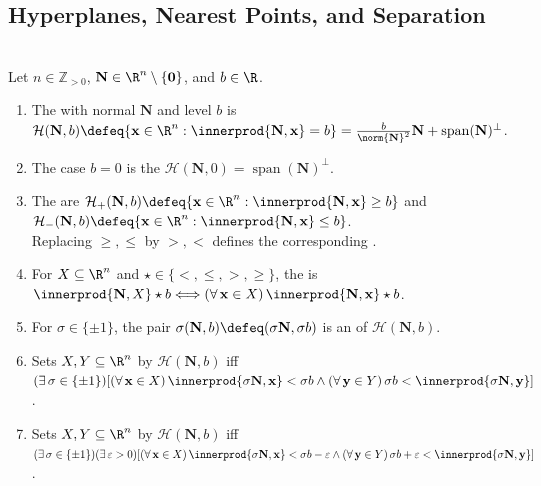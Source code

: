 \subsection{Hyperplanes, Nearest Points, and Separation}

\begin{definition} \label{def:affine-hyperplanes-halfspaces-separation} \\
Let $n\in\mathbb{Z}_{>0}$, $\mathbf{N}\in\R^n\setminus\{\mathbf{0}\}$, and $b\in\R$.
\begin{enumerate}[label=(\roman*)]
\setlength{\itemsep}{0pt}
\item The  with normal $\mathbf{N}$ and level $b$ is $\mathcal{H}(\mathbf{N},b)\defeq\{\mathbf{x}\in\R^n:\innerprod{\mathbf{N},\mathbf{x}}=b\}=\frac{b}{\norm{\mathbf{N}}^2}\mathbf{N}+\operatorname{span}(\mathbf{N})^\perp$.
\item The case $b=0$ is the  $\mathcal{H}(\mathbf{N},0)=\operatorname{span}(\mathbf{N})^\perp$.
\item The  are $\mathcal{H}_+(\mathbf{N},b)\defeq\{\mathbf{x}\in\R^n:\innerprod{\mathbf{N},\mathbf{x}}\geq b\}$ and $\mathcal{H}_-(\mathbf{N},b)\defeq\{\mathbf{x}\in\R^n:\innerprod{\mathbf{N},\mathbf{x}}\leq b\}$.\\
Replacing $\geq,\leq$ by $>,<$ defines the corresponding .
\item For $X\subseteq\R^n$ and $\star\in\{<,\leq,>,\geq\}$, the  is $\innerprod{\mathbf{N},X}\star b\Longleftrightarrow(\forall\,\mathbf{x}\in X)\,\innerprod{\mathbf{N},\mathbf{x}}\star b$.
\item For $\sigma\in\{\pm1\}$, the pair $\sigma(\mathbf{N},b)\defeq(\sigma\mathbf{N},\sigma b)$ is an  of $\mathcal{H}(\mathbf{N},b)$.
\item Sets $X,Y\subseteq\R^n$  by $\mathcal{H}(\mathbf{N},b)$ iff $(\exists\,\sigma\in\{\pm1\})[(\forall\,\mathbf{x}\in X)\,\innerprod{\sigma\mathbf{N},\mathbf{x}}<\sigma b\land(\forall\,\mathbf{y}\in Y)\,\sigma b<\innerprod{\sigma\mathbf{N},\mathbf{y}}]$.
\item Sets $X,Y\subseteq\R^n$  by $\mathcal{H}(\mathbf{N},b)$ iff $(\exists\,\sigma\in\{\pm1\})(\exists\,\varepsilon>0)[(\forall\,\mathbf{x}\in X)\,\innerprod{\sigma\mathbf{N},\mathbf{x}}<\sigma b-\varepsilon\land(\forall\,\mathbf{y}\in Y)\,\sigma b+\varepsilon<\innerprod{\sigma\mathbf{N},\mathbf{y}}]$.
\end{enumerate}
\end{definition}

